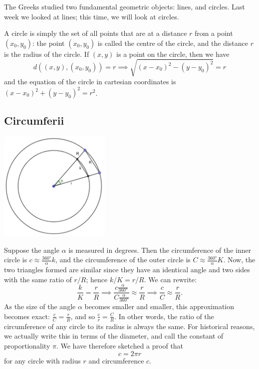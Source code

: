 



The Greeks studied two fundamental geometric objects: lines, and circles. Last week we looked at lines; this time, we will look at
circles.

A circle is simply the set of all points that are at a distance $ r $ from a point $ (x_0, y_0) $: the point $ (x_0,y_0) $ is called
the centre of the circle, and the distance $ r $ is the radius of the circle. If $ (x,y) $ is a point on the circle, then we have
\begin{displaymath}
  d((x,y), (x_0,y_0)) = r \implies \sqrt{(x - x_0)^2 - (y - y_0)^2} = r
\end{displaymath}
and the equation of the circle in cartesian coordinates is $ (x - x_0)^2 + (y - y_0)^2 = r^2 $.

\subsection*{Circumferii}
\begin{center}
  \includegraphics[width=0.4\textwidth]{pi}
\end{center}

Suppose the angle $ \alpha $ is measured in degrees. Then the circumference of the inner circle is $ c \approx \frac{\ang{360}}{\alpha} k $,
and the circumference of the outer circle is $ C \approx \frac{\ang{360}}{\alpha} K $. Now, the two triangles formed are similar since
they have an identical angle and two sides with the same ratio of $ r/R $; hence $ k/K = r/R $. We can rewrite:
\begin{displaymath}
  \frac{k}{K} = \frac{r}{R} \implies \frac{c \frac{\alpha}{\ang{360}}}{C \frac{\alpha}{\ang{360}}} \approx \frac{r}{R} \implies \frac{c}{C} \approx \frac{r}{R}.
\end{displaymath}
As the size of the angle $ \alpha $ becomes smaller and smaller, this approximation becomes exact: $ \frac{c}{C} = \frac{r}{R} $, and
so $ \frac{c}{r} = \frac{C}{R} $. In other words, the ratio of the circumference of any circle to its radius is always the same. For historical
reasons, we actually write this in terms of the diameter, and call the constant of proportionality $ \pi $. We have therefore sketched a
proof that
\begin{displaymath}
  c = 2\pi r
\end{displaymath}
for any circle with radius $ r $ and circumference $ c $.


